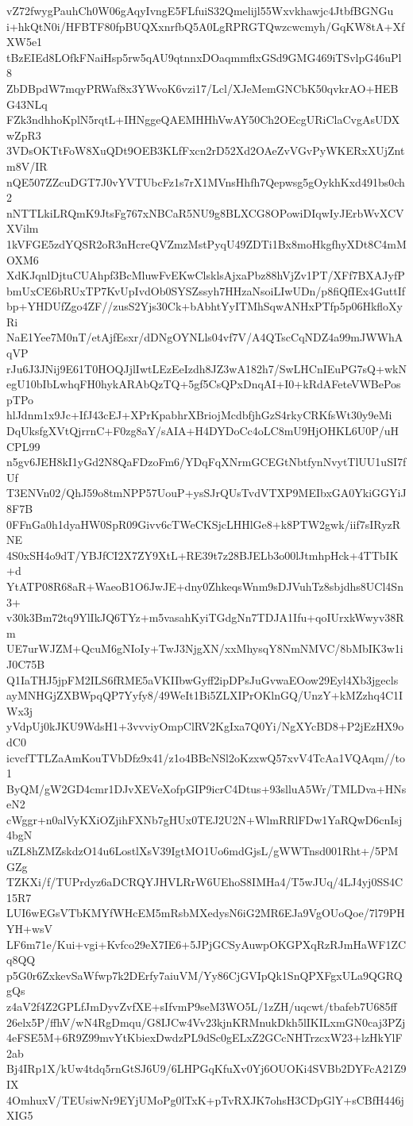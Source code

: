 vZ72fwygPauhCh0W06gAqyIvngE5FLfuiS32Qmelijl55Wxvkhawjc4JtbfBGNGu
i+hkQtN0i/HFBTF80fpBUQXxnrfbQ5A0LgRPRGTQwzcwcmyh/GqKW8tA+XfXW5e1
tBzEIEd8LOfkFNaiHsp5rw5qAU9qtnnxDOaqmmflxGSd9GMG469iTSvlpG46uPl8
ZbDBpdW7mqyPRWaf8x3YWvoK6vzi17/Lcl/XJeMemGNCbK50qvkrAO+HEBG43NLq
FZk3ndhhoKplN5rqtL+IHNggeQAEMHHhVwAY50Ch2OEcgURiClaCvgAsUDXwZpR3
3VDsOKTtFoW8XuQDt9OEB3KLfFxcn2rD52Xd2OAeZvVGvPyWKERxXUjZntm8V/IR
nQE507ZZcuDGT7J0vYVTUbcFz1s7rX1MVnsHhfh7Qepwsg5gOykhKxd491bs0ch2
nNTTLkiLRQmK9JtsFg767xNBCaR5NU9g8BLXCG8OPowiDIqwIyJErbWvXCVXVilm
1kVFGE5zdYQSR2oR3nHcreQVZmzMstPyqU49ZDTi1Bx8moHkgfhyXDt8C4mMOXM6
XdKJqnlDjtuCUAhpf3BcMluwFvEKwClsklsAjxaPbz88hVjZv1PT/XFf7BXAJyfP
bmUxCE6bRUxTP7KvUpIvdOb0SYSZssyh7HHzaNsoiLIwUDn/p8fiQfIEx4GuttIf
bp+YHDUfZgo4ZF//zusS2Yjs30Ck+bAbhtYyITMhSqwANHxPTfp5p06HkfloXyRi
NaE1Yee7M0nT/etAjfEsxr/dDNgOYNLls04vf7V/A4QTscCqNDZ4a99mJWWhAqVP
rJu6J3JNij9E61T0HOQJjlIwtLEzEeIzdh8JZ3wA182h7/SwLHCnIEuPG7sQ+wkN
egU10bIbLwhqFH0hykARAbQzTQ+5gf5CsQPxDnqAI+I0+kRdAFeteVWBePospTPo
hlJdnm1x9Jc+IfJ43cEJ+XPrKpabhrXBriojMcdbfjhGzS4rkyCRKfsWt30y9eMi
DqUksfgXVtQjrrnC+F0zg8aY/sAIA+H4DYDoCc4oLC8mU9HjOHKL6U0P/uHCPL99
n5gv6JEH8kI1yGd2N8QaFDzoFm6/YDqFqXNrmGCEGtNbtfynNvytTlUU1uSI7fUf
T3ENVn02/QhJ59o8tmNPP57UouP+ysSJrQUsTvdVTXP9MEIbxGA0YkiGGYiJ8F7B
0FFnGa0h1dyaHW0SpR09Givv6cTWeCKSjcLHHlGe8+k8PTW2gwk/iif7sIRyzRNE
4S0xSH4o9dT/YBJfCI2X7ZY9XtL+RE39t7z28BJELb3o00lJtmhpHck+4TTbIK+d
YtATP08R68aR+WaeoB1O6JwJE+dny0ZhkeqsWnm9sDJVuhTz8sbjdhs8UCl4Sn3+
v30k3Bm72tq9YlIkJQ6TYz+m5vasahKyiTGdgNn7TDJA1Ifu+qoIUrxkWwyv38Rm
UE7urWJZM+QcuM6gNIoIy+TwJ3NjgXN/xxMhysqY8NmNMVC/8bMbIK3w1iJ0C75B
Q1IaTHJ5jpFM2ILS6fRME5aVKIIbwGyff2ipDPsJuGvwaEOow29Eyl4Xb3jgecls
ayMNHGjZXBWpqQP7Yyfy8/49WeIt1Bi5ZLXIPrOKlnGQ/UnzY+kMZzhq4C1IWx3j
yVdpUj0kJKU9WdsH1+3vvviyOmpClRV2KgIxa7Q0Yi/NgXYcBD8+P2jEzHX9odC0
icvcfTTLZaAmKouTVbDfz9x41/z1o4BBcNSl2oKzxwQ57xvV4TcAa1VQAqm//to1
ByQM/gW2GD4cmr1DJvXEVeXofpGIP9icrC4Dtus+93slluA5Wr/TMLDva+HNseN2
cWggr+n0alVyKXiOZjihFXNb7gHUx0TEJ2U2N+WlmRRlFDw1YaRQwD6cnIsj4bgN
uZL8hZMZskdzO14u6LostlXsV39IgtMO1Uo6mdGjsL/gWWTnsd001Rht+/5PMGZg
TZKXi/f/TUPrdyz6aDCRQYJHVLRrW6UEhoS8IMHa4/T5wJUq/4LJ4yj0SS4C15R7
LUI6wEGsVTbKMYfWHcEM5mRsbMXedysN6iG2MR6EJa9VgOUoQoe/7l79PHYH+wsV
LF6m71e/Kui+vgi+Kvfco29eX7IE6+5JPjGCSyAuwpOKGPXqRzRJmHaWF1ZCq8QQ
p5G0r6ZxkevSaWfwp7k2DErfy7aiuVM/Yy86CjGVIpQk1SnQPXFgxULa9QGRQgQs
z4aV2f4Z2GPLfJmDyvZvfXE+sIfvmP9seM3WO5L/1zZH/uqcwt/tbafeb7U685ff
26elx5P/ffhV/wN4RgDmqu/G8IJCw4Vv23kjnKRMnukDkh5lIKILxmGN0caj3PZj
4eFSE5M+6R9Z99mvYtKbiexDwdzPL9dSc0gELxZ2GCcNHTrzcxW23+lzHkYlF2ab
Bj4IRp1X/kUw4tdq5rnGtSJ6U9/6LHPGqKfuXv0Yj6OUOKi4SVBb2DYFcA21Z9IX
4OmhuxV/TEUsiwNr9EYjUMoPg0lTxK+pTvRXJK7ohsH3CDpGlY+sCBfH446jXIG5
